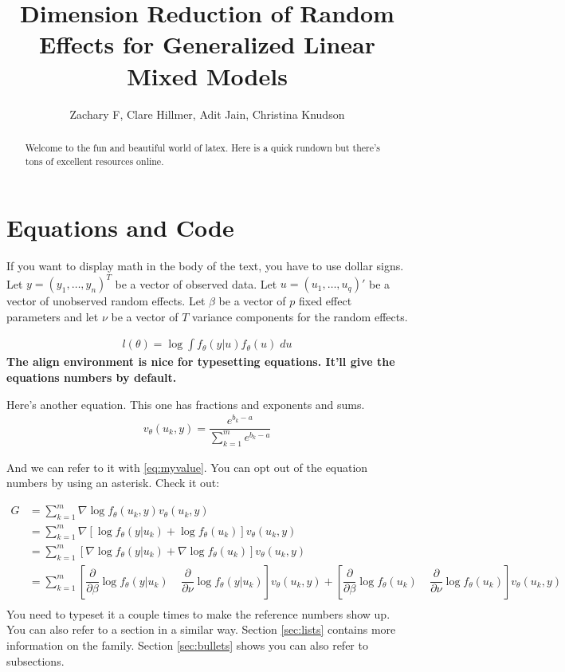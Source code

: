 \documentclass{article}
\title{Dimension Reduction of Random Effects for Generalized Linear Mixed Models}
\author{Zachary F, Clare Hillmer,  Adit Jain, Christina Knudson}
\begin{document}
\maketitle{}

\begin{abstract}
Welcome to the fun and beautiful world of latex. Here is a quick rundown but there's tons of excellent resources online.
\end{abstract}

\section{Equations and Code}
If you want to display math in the body of the text, you have to use dollar signs.
Let $y=(y_1, \ldots, y_n)^T$ be a vector of observed data. Let $u=(u_1,\ldots,u_q)'$ be a vector of unobserved random effects. Let $\beta$ be a vector of $p$ fixed effect parameters and let $\nu$ be a vector of $T$ variance components for the random effects. 

\begin{align}
l(\theta)=\log \int f_\theta(y|u) f_\theta(u) \; du
\end{align}
\textbf{The align environment is nice for typesetting equations. It'll give the equations numbers by default.}

Here's another equation. This one has fractions and exponents and sums.
\begin{align}\label{eq:myvalue}
v_\theta(u_k,y) = \dfrac{e^{b_k-a}}{ \sum_{k=1}^m e^{b_k-a}} 
\end{align}

And we can refer to it with \ref{eq:myvalue}. You can opt out of the equation numbers by using an asterisk. Check it out:

\begin{align*}
G &= \sum_{k=1}^m \nabla \log f_\theta (u_k,y) v_\theta(u_k,y)\\ \label{eq:gradient}
&= \sum_{k=1}^m \nabla \left[  \log f_\theta(y|u_k) + \log f_\theta (u_k)  \right] v_\theta(u_k,y)\\
&= \sum_{k=1}^m  \left[ \nabla \log f_\theta(y|u_k) + \nabla\log f_\theta (u_k)  \right] v_\theta(u_k,y)\\
&= \sum_{k=1}^m  \left[ \dfrac{\partial}{\partial \beta} \log f_\theta(y|u_k) \; \; \; \;  \dfrac{\partial}{\partial \nu} \log f_\theta(y|u_k) \right] v_\theta(u_k,y)+ \left[ \dfrac{\partial}{\partial \beta} \log f_\theta(u_k) \; \; \; \; \dfrac{\partial}{\partial \nu} \log f_\theta(u_k) \right] v_\theta(u_k,y)\\
\end{align*}
 You need to typeset it a couple times to make the reference numbers show up.  
You can also refer to a section in a similar way. Section \ref{sec:lists} contains more information on the family. Section \ref{sec:bullets}  shows you can also refer to subsections.
\end{document}
